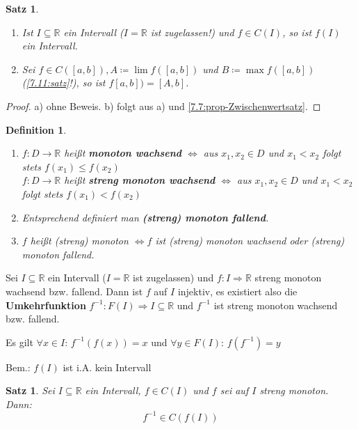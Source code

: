 \documentclass[14pt,titlepage,ngerman,a4paper,headsepline,DIV15,halfparskip*]{scrartcl}
\newcommand{\R}{\mathbb{R}}
\theoremstyle{named}
\theoremstyle{dotless}
\newtheorem{satz}[namedtheorem]{Satz}
\newtheorem*{definition}{Definition}
\begin{document}
\begin{satz} ~\ \label{7.12:satz}
	\begin{enumerate}
		\item Ist $I \subseteq \R$ ein Intervall ($I = \R$ ist zugelassen!) und $f \in C(I)$, so ist $f(I)$ ein Intervall.
		\item Sei $f \in C([a, b]), A \coloneqq \lim f([a, b])$ und $B \coloneqq \max f([a, b])$ (\ref{7.11:satz}!), so ist $f[a, b]) = [A, b]$.
	\end{enumerate}
\end{satz}

\begin{proof}
	a) ohne Beweis. b) folgt aus a) und \ref{7.7:prop-Zwischenwertsatz}.
\end{proof}

      
\begin{definition} ~\
	\begin{enumerate}
		\item $f \colon D \rightarrow \R$ hei{\ss}t \textbf{monoton wachsend} $\iff$ aus $x_{1}, x_{2} \in D$ und $x_{1} < x_{2}$ folgt stets $f(x_{1}) \leq f(x_{2})$ \\
			$f \colon D \rightarrow \R$ hei{\ss}t \textbf{streng monoton wachsend} $\iff$ aus $x_{1}, x_{2} \in D$ und $x_{1} < x_{2}$ folgt stets $f(x_{1}) < f(x_{2})$
		\item Entsprechend definiert man \textbf{(streng) monoton fallend}.
		\item $f$ hei{\ss}t (streng) monoton $\iff f$ ist (streng) monoton wachsend oder (streng) monoton fallend.
	\end{enumerate}
\end{definition}


Sei $I \subseteq \R$ ein Intervall ($I = \R$ ist zugelassen) und $f \colon I \Rightarrow \R$ streng monoton wachsend bzw. fallend. Dann ist $f$ auf $I$ injektiv, es existiert also die \textbf{Umkehrfunktion} $f^{-1} \colon F(I) \Rightarrow I \subseteq \R$ und $f^{-1}$ ist streng monoton wachsend bzw. fallend.

Es gilt $\forall x \in I$: $f^{-1}(f(x)) = x$ und $\forall y \in F(I)$: $f(f^{-1}) =y$

Bem.: $f(I)$ ist i.A. kein Intervall %


\begin{satz} \label{7.13:satz}
	Sei $I \subseteq \R$ ein Intervall, $f \in C(I)$ und $f$ sei auf $I$ streng monoton. Dann:
	$$ f^{-1} \in C \left( f(I) \right) $$	
\end{satz}
\end{document}

